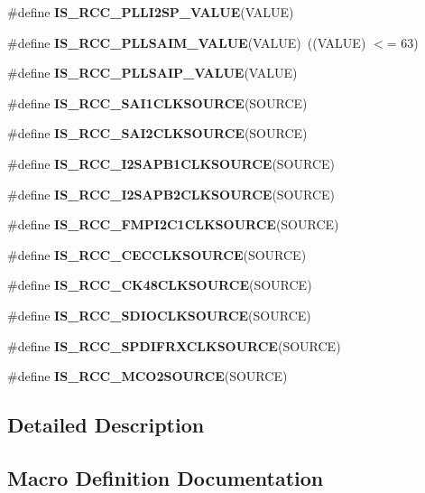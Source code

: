 \begin{DoxyCompactItemize}
\item 
\#define {\bfseries I\+S\+\_\+\+R\+C\+C\+\_\+\+P\+L\+L\+I2\+S\+P\+\_\+\+V\+A\+L\+UE}(V\+A\+L\+UE)
\item 
\#define {\bfseries I\+S\+\_\+\+R\+C\+C\+\_\+\+P\+L\+L\+S\+A\+I\+M\+\_\+\+V\+A\+L\+UE}(V\+A\+L\+UE)~((V\+A\+L\+UE) $<$= 63)\hypertarget{group___r_c_c_ex___i_s___r_c_c___definitions_ga518b443396ee330ca3a8f97ca1735068}{}\label{group___r_c_c_ex___i_s___r_c_c___definitions_ga518b443396ee330ca3a8f97ca1735068}

\item 
\#define {\bfseries I\+S\+\_\+\+R\+C\+C\+\_\+\+P\+L\+L\+S\+A\+I\+P\+\_\+\+V\+A\+L\+UE}(V\+A\+L\+UE)
\item 
\#define {\bfseries I\+S\+\_\+\+R\+C\+C\+\_\+\+S\+A\+I1\+C\+L\+K\+S\+O\+U\+R\+CE}(S\+O\+U\+R\+CE)
\item 
\#define {\bfseries I\+S\+\_\+\+R\+C\+C\+\_\+\+S\+A\+I2\+C\+L\+K\+S\+O\+U\+R\+CE}(S\+O\+U\+R\+CE)
\item 
\#define {\bfseries I\+S\+\_\+\+R\+C\+C\+\_\+\+I2\+S\+A\+P\+B1\+C\+L\+K\+S\+O\+U\+R\+CE}(S\+O\+U\+R\+CE)
\item 
\#define {\bfseries I\+S\+\_\+\+R\+C\+C\+\_\+\+I2\+S\+A\+P\+B2\+C\+L\+K\+S\+O\+U\+R\+CE}(S\+O\+U\+R\+CE)
\item 
\#define {\bfseries I\+S\+\_\+\+R\+C\+C\+\_\+\+F\+M\+P\+I2\+C1\+C\+L\+K\+S\+O\+U\+R\+CE}(S\+O\+U\+R\+CE)
\item 
\#define {\bfseries I\+S\+\_\+\+R\+C\+C\+\_\+\+C\+E\+C\+C\+L\+K\+S\+O\+U\+R\+CE}(S\+O\+U\+R\+CE)
\item 
\#define {\bfseries I\+S\+\_\+\+R\+C\+C\+\_\+\+C\+K48\+C\+L\+K\+S\+O\+U\+R\+CE}(S\+O\+U\+R\+CE)
\item 
\#define {\bfseries I\+S\+\_\+\+R\+C\+C\+\_\+\+S\+D\+I\+O\+C\+L\+K\+S\+O\+U\+R\+CE}(S\+O\+U\+R\+CE)
\item 
\#define {\bfseries I\+S\+\_\+\+R\+C\+C\+\_\+\+S\+P\+D\+I\+F\+R\+X\+C\+L\+K\+S\+O\+U\+R\+CE}(S\+O\+U\+R\+CE)
\item 
\#define {\bfseries I\+S\+\_\+\+R\+C\+C\+\_\+\+M\+C\+O2\+S\+O\+U\+R\+CE}(S\+O\+U\+R\+CE)
\end{DoxyCompactItemize}


\subsection{Detailed Description}


\subsection{Macro Definition Documentation}

